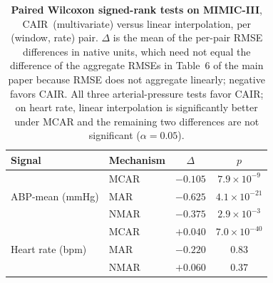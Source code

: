 \begin{table}[t]
  \centering
  {\small
  \setlength{\tabcolsep}{6pt}
  \begin{tabular}{llcc}
    \toprule
    Signal & Mechanism & $\Delta$ & $p$ \\
    \midrule
    \multirow{3}{*}{ABP-mean (mmHg)}
      & MCAR & $-0.105$ & $7.9\times10^{-9}$ \\
      & MAR  & $-0.625$ & $4.1\times10^{-21}$ \\
      & NMAR & $-0.375$ & $2.9\times10^{-3}$ \\
    \midrule
    \multirow{3}{*}{Heart rate (bpm)}
      & MCAR & $+0.040$ & $7.0\times10^{-40}$ \\
      & MAR  & $-0.220$ & $0.83$ \\
      & NMAR & $+0.060$ & $0.37$ \\
    \bottomrule
  \end{tabular}}
  \caption{\textbf{Paired Wilcoxon signed-rank tests on MIMIC-III}, CAIR\
  (multivariate) versus linear interpolation, per (window, rate) pair.
  $\Delta$ is the mean of the per-pair RMSE differences in native units, which
  need not equal the difference of the aggregate RMSEs in Table~6 of the main
  paper because RMSE does not aggregate linearly; negative favors CAIR. All three arterial-pressure tests favor CAIR; on heart rate,
  linear interpolation is significantly better under MCAR and the remaining two
  differences are not significant ($\alpha=0.05$).}
  \label{tab:mimic-wilcoxon}
\end{table}

